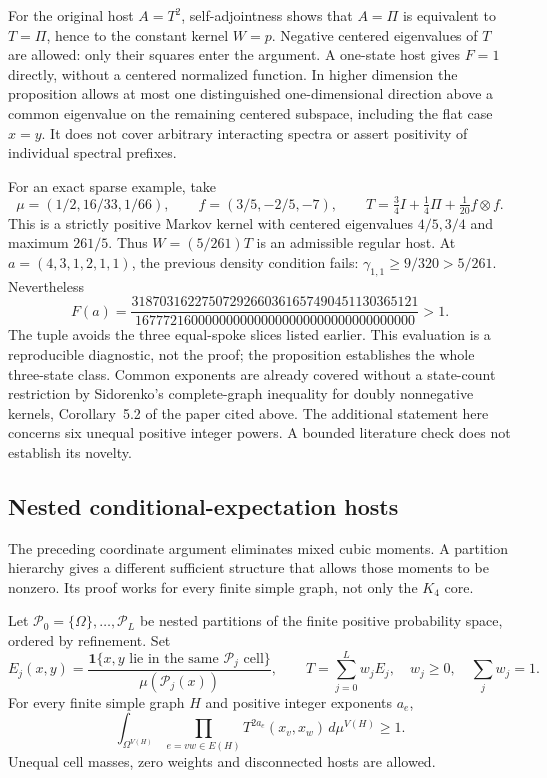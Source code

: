 For the original host $A=T^2$, self-adjointness shows that $A=\Pi$
is equivalent to $T=\Pi$, hence to the constant kernel $W=p$.
Negative centered eigenvalues of $T$ are allowed: only their squares
enter the argument.  A one-state host gives $F=1$ directly, without a
centered normalized function.  In higher dimension the proposition
allows at most one distinguished one-dimensional direction above a common
eigenvalue on the remaining centered subspace, including the flat case $x=y$.
It does not cover arbitrary
interacting spectra or assert positivity of individual spectral prefixes.

For an exact sparse example, take
\[
 \mu=(1/2,16/33,1/66),\qquad f=(3/5,-2/5,-7),\qquad
 T=\tfrac34I+\tfrac14\Pi+\tfrac1{20}f\otimes f.
\]
This is a strictly positive Markov kernel with centered eigenvalues
$4/5,3/4$ and maximum $261/5$.  Thus $W=(5/261)T$ is an admissible
regular host.  At $a=(4,3,1,2,1,1)$, the previous density condition fails:
$\gamma_{1,1}\geq9/320>5/261$.  Nevertheless
\[
 F(a)=\frac{31870316227507292660361657490451130365121}
             {1677721600000000000000000000000000000000}>1.
\]
The tuple avoids the three equal-spoke slices listed earlier.  This
evaluation is a reproducible diagnostic, not the proof; the proposition
establishes the whole three-state class.  Common exponents are already
covered without a state-count restriction by Sidorenko's complete-graph
inequality for doubly nonnegative kernels, Corollary~5.2 of the paper cited
above.  The additional statement here concerns six unequal positive integer
powers.  A bounded literature check does not establish its novelty.

\subsection{Nested conditional-expectation hosts}

The preceding coordinate argument eliminates mixed cubic moments.
A partition hierarchy gives a different sufficient structure that allows
those moments to be nonzero.  Its proof works for every finite simple graph,
not only the $K_4$ core.

\begin{proposition}
Let $\mathcal P_0=\{\Omega\},\ldots,\mathcal P_L$ be nested partitions
of the finite positive probability space, ordered by refinement.  Set
\[
 E_j(x,y)=\frac{\mathbf1\{x,y\text{ lie in the same }\mathcal P_j
                         \text{ cell}\}}{\mu(\mathcal P_j(x))},
 \qquad T=\sum_{j=0}^Lw_jE_j,
 \quad w_j\geq0,\quad\sum_jw_j=1.
\]
For every finite simple graph $H$ and positive integer exponents $a_e$,
\begin{equation}
 \int_{\Omega^{V(H)}}\prod_{e=vw\in E(H)}
              T^{2a_e}(x_v,x_w)\,d\mu^{V(H)}\geq1.
 \label{eq:hierarchical-common-powers}
\end{equation}
Unequal cell masses, zero weights and disconnected hosts are allowed.
\end{proposition}

